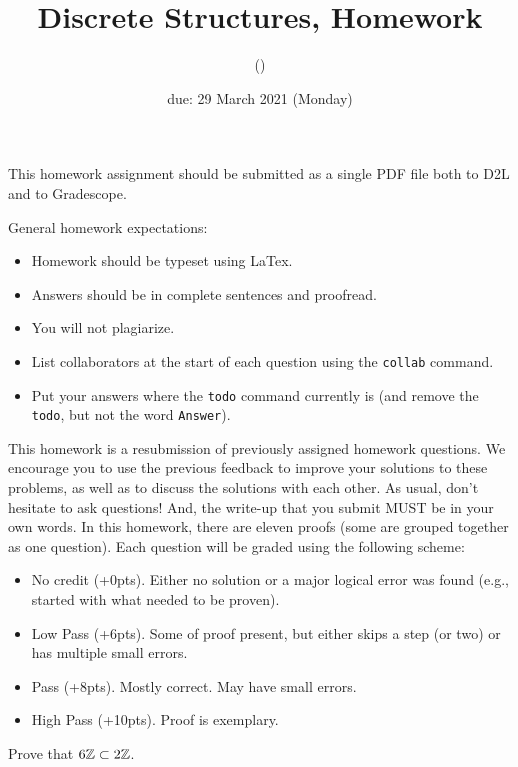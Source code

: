 \documentclass{article}
\title{Discrete Structures, Homework \hwnum}
\author{\todo{Your Name Here} (\todo{your discord handle here})}
\date{due: 29 March 2021 (Monday)}
\begin{document}
\maketitle

This homework assignment should be
submitted as a single PDF file both to D2L and to Gradescope.

General homework expectations:
\begin{itemize}
    \item Homework should be typeset using LaTex.
    \item Answers should be in complete sentences and proofread.
    \item You will not plagiarize.
    \item List collaborators at the start of each question using the \texttt{collab} command.
    \item Put your answers where the \texttt{todo} command currently is (and
        remove the \texttt{todo}, but not the word \texttt{Answer}).
\end{itemize}

{\color{blue} This homework is a resubmission of previously assigned homework
questions.  We encourage you to use the previous feedback to improve your
solutions to these problems, as well as to discuss the solutions with each other.
As usual, don't hesitate to ask questions! And, the write-up that you submit
MUST be in your own words.  In
this homework, there are eleven proofs (some are grouped together as one
question).  Each question will be graded using the following scheme:
\begin{itemize}
    \item No credit (+0pts). Either no solution or a major logical error was found
        (e.g., started with what needed to be proven).
    \item Low Pass (+6pts). Some of proof present, but either skips a step (or
        two) or
        has multiple small errors.
    \item Pass (+8pts). Mostly correct. May have small errors.
    \item High Pass (+10pts). Proof is exemplary.
\end{itemize}
}


\collab{\todo{}}

Prove that $6{\mathbb Z} \subset 2{\mathbb Z}$.
\end{document}
